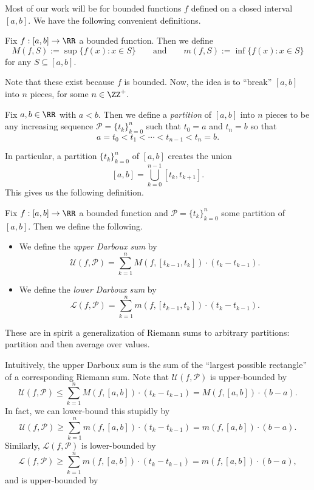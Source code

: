 Most of our work will be for bounded functions $f$ defined on a closed interval $[a,b].$ We have the following convenient definitions.
\begin{definition}
	Fix $f:[a,b]\to\RR$ a bounded function. Then we define
	\[M(f,S):=\sup\{f(x):x\in S\}\qquad\text{and}\qquad m(f,S):=\inf\{f(x):x\in S\}\]
	for any $S\subseteq[a,b].$
\end{definition}
Note that these exist because $f$ is bounded. Now, the idea is to ``break'' $[a,b]$ into $n$ pieces, for some $n\in\ZZ^+.$
\begin{definition}[Partition]
	Fix $a,b\in\RR$ with $a<b.$ Then we define a \textit{partition} of $[a,b]$ into $n$ pieces to be any increasing sequence $\mathcal P=\{t_k\}_{k=0}^n$ such that $t_0=a$ and $t_n=b$ so that
	\[a=t_0<t_1<\cdots<t_{n-1}<t_n=b.\]
\end{definition}
In particular, a partition $\{t_k\}_{k=0}^n$ of $[a,b]$ creates the union
\[[a,b]=\bigcup_{k=0}^{n-1}[t_k,t_{k+1}].\]
This gives us the following definition.
\begin{definition}
	Fix $f:[a,b]\to\RR$ a bounded function and $\mathcal P=\{t_k\}_{k=0}^n$ some partition of $[a,b].$ Then we define the following.
	\begin{itemize}
		\item We define the \textit{upper Darboux sum} by
		\[\mathcal U(f,\mathcal P)=\sum_{k=1}^nM(f,[t_{k-1},t_k])\cdot(t_k-t_{k-1}).\]
		\item We define the \textit{lower Darboux sum} by
		\[\mathcal L(f,\mathcal P)=\sum_{k=1}^nm(f,[t_{k-1},t_k])\cdot(t_k-t_{k-1}).\]
	\end{itemize}
\end{definition}
\begin{remark}
	These are in spirit a generalization of Riemann sums to arbitrary partitions: partition and then average over values.
\end{remark}
Intuitively, the upper Darboux sum is the sum of the ``largest possible rectangle'' of a corresponding Riemann sum. Note that $\mathcal U(f,\mathcal P)$ is upper-bounded by
\[\mathcal U(f,\mathcal P)\le\sum_{k=1}^nM(f,[a,b])\cdot(t_k-t_{k-1})=M(f,[a,b])\cdot(b-a).\]
In fact, we can lower-bound this stupidly by
\[\mathcal U(f,\mathcal P)\ge\sum_{k=1}^nm(f,[a,b])\cdot(t_k-t_{k-1})=m(f,[a,b])\cdot(b-a).\]
Similarly, $\mathcal L(f,\mathcal P)$ is lower-bounded by
\[\mathcal L(f,\mathcal P)\ge\sum_{k=1}^nm(f,[a,b])\cdot(t_k-t_{k-1})=m(f,[a,b])\cdot(b-a),\]
and is upper-bounded by

